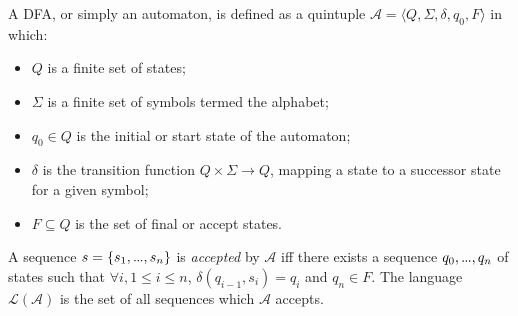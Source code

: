\documentclass[phd,electronic,oneside,twosidetoc,letterpaper,chaptercenter,parttop,lol,lof,lot]{byumsphd}
\newcommand\mydots{\hbox to .75em{.\hss.\hss.}}
\begin{document}
A DFA, or simply an automaton, is defined as a quintuple $\mathcal{A} = \langle Q, \Sigma, \delta, q_0, F\rangle$ in which:
\begin{itemize}
\item $Q$ is a finite set of states;
\item $\Sigma$ is a finite set of symbols termed the alphabet;
\item $q_0 \in Q$ is the initial or start state of the automaton;
\item $\delta$ is the transition function $Q \times \Sigma \rightarrow Q$, mapping a state to a successor state for a given symbol;
\item $F \subseteq Q$ is the set of final or accept states.
\end{itemize}

A sequence $s = \{s_1,\mydots,s_n\}$ is \textit{accepted} by $\mathcal{A}$ iff there exists a sequence $q_0,\mydots, q_n$ of states such that $\forall i, 1 \leq i \leq n$, $\delta(q_{i-1},s_i) = q_i$ and $q_n\in F$. The language $\mathcal{L}(\mathcal{A})$ is the set of all sequences which $\mathcal{A}$ accepts.
\end{document}
